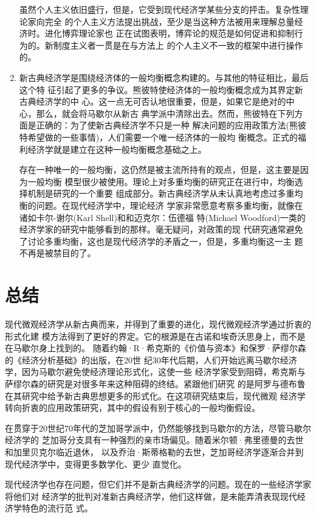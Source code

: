 \begin{enumerate}
  虽然个人主义依旧盛行，但是，它受到现代经济学某些分支的抨击。复杂性理论家向完全
  的个人主义方法提出挑战，至少是当这种方法被用来理解总量经济时。进化博弈理论家也
  正在试图表明，博弈论的规范是如何促进和抑制行为的。新制度主义者一贯是在与方法上
  的个人主义不一致的框架中进行操作的。

\item 新古典经济学是围绕经济体的一般均衡概念构建的。与其他的特征相比，最后这个特
  征引起了更多的争议。熊彼特使经济体的一般均衡概念成为其界定新古典经济学的中
  心。这一点无可否认地很重要，但是，如果它是绝对的中心，那么，就会将马歇尔从新古
  典学派中清除出去。然而，熊彼特在下列方面是正确的：为了使新古典经济学不只是一种
  解决问题的应用政策方法(熊彼特希望做的一些事情)，人们需要一个唯一经济体的一般均
  衡概念。正式的福利经济学就是建立在这种一般均衡概念基础之上。

  存在一种唯一的一般均衡，这仍然是被主流所持有的观点，但是，这主要是因为一般均衡
  模型很少被使用。理论上对多重均衡的研究正在进行中，均衡选择机制是研究的一个重要
  组成部分。新古典经济学从未认真地考虑过多重均衡的问题。在现代经济学中，理论经济
  学家非常愿意考察多重均衡，就像在诸如卡尔-谢尔(Karl Shell)和和迈克尔：伍德福
  特(Michael Woodford)一类的经济学家的研究中能够看到的那样。毫无疑问，对政策的现
  代研究通常避免了讨论多重均衡，这也是现代经济学的矛盾之一，但是，多重均衡这一主
  题不再是被禁目的了。
\end{enumerate}

\section{总结}

现代微观经济学从新古典而来，并得到了重要的进化，现代微观经济学通过折衷的形式化建
模方法得到了更好的界定。它的根源是在古诺和埃奇沃思身上，而不是在马歇尔身上找到的。
随着约翰·R·希克斯的《价值与资本》和保罗·萨缪尔森的《经济分析基础》的出版，在20世
纪30年代后期，人们开始远离马歇尔经济学，因为马歇尔避免使经济理论形式化，这使一些
经济学家受到阻碍，希克斯与萨缪尔森的研究是对很多年来这种阻碍的终结。紧跟他们研究
的是阿罗与德布鲁在其研究中给予新古典思想更多的形式化。在这项研究结束后，现代微观
经济学转向折衷的应用政策研究，其中的假设有别于核心的一般均衡假设。

在贯穿于20世纪70年代的芝加哥学派中，仍然能够找到马歇尔的方法，尽管马歇尔经济学的
芝加哥分支具有一种强烈的亲市场偏见。随着米尔顿·弗里德曼的去世和加里贝克尔临近退休，
以及乔治·斯蒂格勒的去世，芝加哥经济学逐渐合并到现代经济学中，变得更多数学化、更少
直觉化。

现代经济学也存在问题，但它们并不是新古典经济学的问题。现在的一些经济学家将他们对
经济学的批判对准新古典经济学，他们这样做，是未能弄清表现现代经济学特色的流行范
式。
